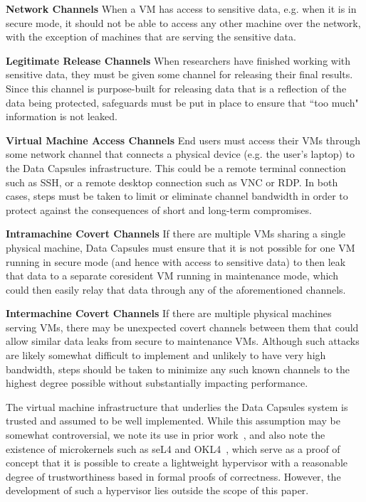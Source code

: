 \documentclass{acm_proc_article-sp}
\begin{document}
\textbf{Network Channels} When a VM has access to sensitive data, e.g. when it
is in secure mode, it should not be able to access any other machine over the
network, with the exception of machines that are serving the sensitive data.

\textbf{Legitimate Release Channels} When researchers have finished working with
sensitive data, they must be given some channel for releasing their final
results.  Since this channel is purpose-built for releasing data that is a
reflection of the data being protected, safeguards must be put in place to
ensure that ``too much" information is not leaked.

\textbf{Virtual Machine Access Channels} End users must access their VMs
through some network channel that connects a physical device (e.g. the user's
laptop) to the Data Capsules infrastructure.  This could be a remote terminal
connection such as SSH, or a remote desktop connection such as VNC or RDP.  In
both cases, steps must be taken to limit or eliminate channel bandwidth in order
to protect against the consequences of short and long-term compromises.

\textbf{Intramachine Covert Channels} If there are multiple VMs sharing a
single physical machine, Data Capsules must ensure that it is not possible for
one VM running in secure mode (and hence with access to sensitive data) to then
leak that data to a separate coresident VM running in maintenance mode, which
could then easily relay that data through any of the aforementioned channels.

\textbf{Intermachine Covert Channels} If there are multiple physical machines
serving VMs, there may be unexpected covert channels between them that could
allow similar data leaks from secure to maintenance VMs.  Although such attacks
are likely somewhat difficult to implement and unlikely to have very high
bandwidth, steps should be taken to minimize any such known channels to the
highest degree possible without substantially impacting performance.

The virtual machine infrastructure that underlies the Data Capsules system is
trusted and assumed to be well implemented.  While this assumption may be
somewhat controversial, we note its use in prior work~\cite{capsules-borders},
and also note the existence of microkernels such as seL4 and OKL4~\cite{sel4,
sel4-secure, OKL4}, which serve as a proof of concept that it is possible to
create a lightweight hypervisor with a reasonable degree of trustworthiness
based in formal proofs of correctness.  However, the development of such a
hypervisor lies outside the scope of this paper.
\end{document}
